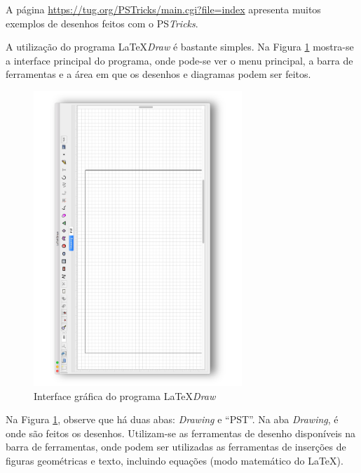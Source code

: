 \begin{marker}
A página \url{https://tug.org/PSTricks/main.cgi?file=index} apresenta muitos exemplos de desenhos feitos com o PS\textit{Tricks}.
\end{marker}

A utilização do programa \LaTeX\textit{Draw} é bastante simples. Na Figura \ref{fig:interld} mostra-se a interface principal do programa, onde pode-se ver o menu principal, a barra de ferramentas e a área em que os desenhos e diagramas podem ser feitos.

\begin{figure}[H]
\caption{Interface gráfica do programa \LaTeX\textit{Draw}}
\vspace{6mm}
    \begin{center}
        \includegraphics[width=0.7\textwidth,angle=-90]{./docs/figs/ldraw1.pdf}
    \end{center}
\vspace{4mm}
\label{fig:interld}
\end{figure}

Na Figura \ref{fig:interld}, observe que há duas abas: \textit{Drawing} e ``PST''. Na aba \textit{Drawing}, é onde são feitos os desenhos. Utilizam-se as ferramentas de desenho disponíveis na barra de ferramentas, onde podem ser utilizadas as ferramentas de inserções de figuras geométricas e texto, incluindo equações (modo matemático do \LaTeX{}).

